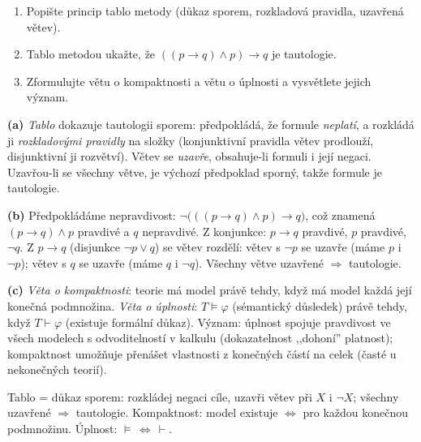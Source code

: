 \begin{zadani}
\begin{enumerate}[label=(\alph*)]
  \item {} Popište princip tablo metody (důkaz sporem, rozkladová pravidla, uzavřená větev).
  \item {} Tablo metodou ukažte, že $((p\to q)\wedge p)\to q$ je tautologie.
  \item {} Zformulujte větu o kompaktnosti a větu o úplnosti a vysvětlete jejich význam.
\end{enumerate}
\end{zadani}

\begin{reseni}
\textbf{(a)} \emph{Tablo} dokazuje tautologii sporem: předpokládá, že formule \emph{neplatí}, a rozkládá ji \emph{rozkladovými pravidly} na složky (konjunktivní pravidla větev prodlouží, disjunktivní ji rozvětví). Větev se \emph{uzavře}, obsahuje-li formuli i její negaci. Uzavřou-li se všechny větve, je výchozí předpoklad sporný, takže formule je tautologie.

\textbf{(b)} Předpokládáme nepravdivost: $\neg\big(((p\to q)\wedge p)\to q\big)$, což znamená $(p\to q)\wedge p$ pravdivé a $q$ nepravdivé. Z konjunkce: $p\to q$ pravdivé, $p$ pravdivé, $\neg q$. Z $p\to q$ (disjunkce $\neg p\vee q$) se větev rozdělí: větev s $\neg p$ se uzavře (máme $p$ i $\neg p$); větev s $q$ se uzavře (máme $q$ i $\neg q$). Všechny větve uzavřené $\Rightarrow$ tautologie.

\textbf{(c)} \emph{Věta o kompaktnosti}: teorie má model právě tehdy, když má model každá její konečná podmnožina. \emph{Věta o úplnosti}: $T\models\varphi$ (sémantický důsledek) právě tehdy, když $T\vdash\varphi$ (existuje formální důkaz). Význam: úplnost spojuje pravdivost ve všech modelech s odvoditelností v kalkulu (dokazatelnost ,,dohoní'' platnost); kompaktnost umožňuje přenášet vlastnosti z konečných částí na celek (časté u nekonečných teorií).
\end{reseni}

\begin{jadro}
Tablo = důkaz sporem: rozkládej negaci cíle, uzavři větev při $X$ i $\neg X$; všechny uzavřené $\Rightarrow$ tautologie. Kompaktnost: model existuje $\iff$ pro každou konečnou podmnožinu. Úplnost: $\models\,\iff\,\vdash$.
\end{jadro}

